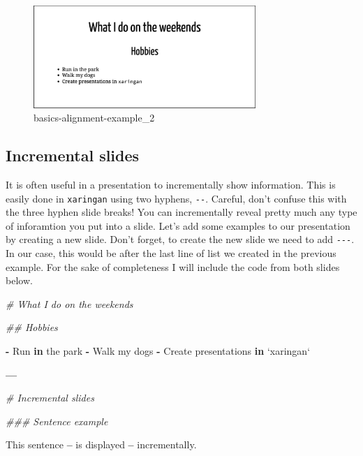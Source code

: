 \documentclass[
]{book}
\newenvironment{Shaded}{\begin{snugshade}}{\end{snugshade}}
\newcommand{\CommentTok}[1]{\textcolor[rgb]{0.37,0.37,0.37}{\textit{#1}}}
\newcommand{\ControlFlowTok}[1]{\textcolor[rgb]{0.27,0.27,0.27}{\textbf{#1}}}
\newcommand{\DataTypeTok}[1]{\textcolor[rgb]{0.27,0.27,0.27}{#1}}
\newcommand{\NormalTok}[1]{#1}
\newcommand{\OperatorTok}[1]{\textcolor[rgb]{0.43,0.43,0.43}{\textbf{#1}}}
\newcommand{\StringTok}[1]{\textcolor[rgb]{0.5,0.5,0.5}{#1}}
\begin{document}
\begin{figure}
\centering
\includegraphics[width=0.75\textwidth,height=\textheight]{img/02_basics-alignment-example_2.png}
\caption{basics-alignment-example\_2}
\end{figure}

\hypertarget{incremental-slides}{%
\subsection{Incremental slides}\label{incremental-slides}}

It is often useful in a presentation to incrementally show information. This is easily done in \texttt{xaringan} using two hyphens, \texttt{-\/-}. Careful, don't confuse this with the three hyphen slide breaks! You can incrementally reveal pretty much any type of inforamtion you put into a slide. Let's add some examples to our presentation by creating a new slide. Don't forget, to create the new slide we need to add \texttt{-\/-\/-}. In our case, this would be after the last line of list we created in the previous example. For the sake of completeness I will include the code from both slides below.

\begin{Shaded}
\begin{Highlighting}[]
\CommentTok{# What I do on the weekends}

\CommentTok{## Hobbies}

\OperatorTok{-}\StringTok{ }\NormalTok{Run }\ControlFlowTok{in}\NormalTok{ the park}
\OperatorTok{-}\StringTok{ }\NormalTok{Walk my dogs}
\OperatorTok{-}\StringTok{ }\NormalTok{Create presentations }\ControlFlowTok{in} \StringTok{`}\DataTypeTok{xaringan}\StringTok{`}

\OperatorTok{---}

\CommentTok{# Incremental slides}

\CommentTok{### Sentence example}

\NormalTok{This sentence}
\OperatorTok{--}
\NormalTok{is displayed }
\OperatorTok{--}
\NormalTok{incrementally. }
\end{Highlighting}
\end{Shaded}
\end{document}
